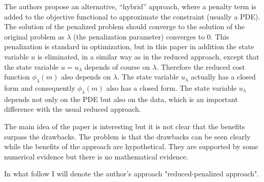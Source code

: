 \documentclass[12pt]{article}
\begin{document}
The authors propose an alternative, ``hybrid'' approach, where a penalty term is added to the objective functional to approximate the constraint (usually a PDE). 
The solution of the penalized problem should converge to the solution of the original problem as $\lambda$ (the penalization parameter) converges to $0$. 
This penalization is standard in optimization, but in this paper in addition the state variable $u$ is eliminated, in a similar way as in the reduced approach, except that the state variable $u=u_\lambda$ depends of course on $\lambda$. Therefore the reduced cost function $\phi_\lambda(m)$ also depends on $\lambda$. The state variable $u_\lambda$ actually has a closed form and consequently $\phi_\lambda(m)$ also has a closed form. The state variable $u_\lambda$ depends not only on the PDE but also on the data, which is an important difference with the usual reduced approach. 

The main idea of the paper is interesting but it is not clear that the benefits surpass the drawbacks. The problem is that the drawbacks can be seen clearly while the benefits of the approach are hypothetical. They are supported by some numerical evidence but there is no mathematical evidence.

In what follow I will denote the author's approach "reduced-penalized approach". 
\end{document}
